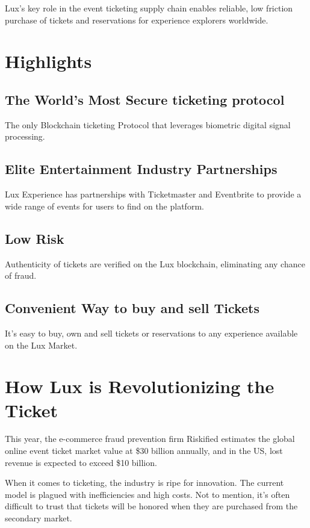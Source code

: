 \documentclass[11pt]{article}
\begin{document}
Lux's key role in the event ticketing supply chain enables reliable, low friction purchase of tickets and reservations for experience explorers worldwide.


\section{Highlights}

\subsection{The World's Most Secure ticketing protocol}

The only Blockchain ticketing Protocol that leverages biometric digital signal processing.


\subsection{Elite Entertainment Industry Partnerships}

Lux Experience has partnerships with Ticketmaster and Eventbrite to provide a wide range of events for users to find on the platform.


\subsection{Low Risk}

Authenticity of tickets are verified on the Lux blockchain, eliminating any chance of fraud.


\subsection{Convenient Way to buy and sell Tickets}

It's easy to buy, own and sell tickets or reservations to any experience available on the Lux Market.


\section{How Lux is Revolutionizing the Ticket}

This year, the e-commerce fraud prevention firm Riskified estimates the global online event ticket market value at \$30 billion annually, and in the US, lost revenue is expected to exceed \$10 billion.


When it comes to ticketing, the industry is ripe for innovation. The current model is plagued with inefficiencies and high costs. Not to mention, it's often difficult to trust that tickets will be honored when they are purchased from the secondary market.
\end{document}
